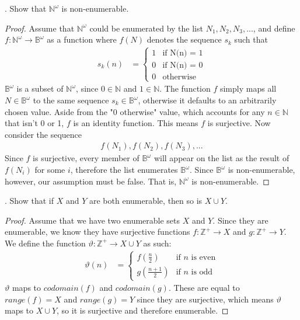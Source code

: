 \documentclass[11pt]{article}
\begin{document}
\newpage
{}. Show that $\mathbb{N}^\omega$ is non-enumerable.

\color{RoyalBlue}
\begin{proof}
Assume that $\mathbb{N}^\omega$ could be enumerated by the list $N_1, N_2, N_3, ...$, and define $f: \mathbb{N}^\omega \to \mathbb{B}^\omega$ as a function where $f(N)$ denotes the sequence $s_k$ such that
\begin{align}
    s_k(n) & = 
    \begin{cases} 
    1 & \text{if N(n) = 1} \\
    0 & \text{if N(n) = 0} \\
    0 & \text{otherwise}
    \end{cases}
\end{align}
$\mathbb{B}^\omega$ is a subset of $\mathbb{N}^\omega$, since $0 \in \mathbb{N}$ and $1 \in \mathbb{N}$. The function $f$ simply maps all $N \in \mathbb{B}^\omega$ to the same sequence $s_k \in \mathbb{B}^\omega$, otherwise it defaults to an arbitrarily chosen value. Aside from the "0 otherwise" value, which accounts for any $n \in \mathbb{N}$ that isn't 0 or 1, $f$ is an identity function. This means $f$ is surjective. Now consider the sequence
\begin{align}
    f(N_1), f(N_2), f(N_3), ...
\end{align}
Since $f$ is surjective, every member of $\mathbb{B}^\omega$ will appear on the list as the result of $f(N_i)$ for some $i$, therefore the list enumerates $\mathbb{B}^\omega$. Since $\mathbb{B}^\omega$ is non-enumerable, however, our assumption must be false. That is, $\mathbb{N}^\omega$ is non-enumerable.
\end{proof}
\color{black}


\newpage
{}. Show that if $X$ and $Y$ are both enumerable, then so is $X \cup Y$.

\color{RoyalBlue}
\begin{proof}
Assume that we have two enumerable sets $X$ and $Y$. Since they are enumerable, we know they have surjective functions $f: \mathbb{Z}^+ \to X$ and $g: \mathbb{Z}^+ \to Y$. We define the function $\vartheta: \mathbb{Z}^+ \to X \cup Y$ as such:
\begin{align}
    \vartheta(n) & = 
    \begin{cases} 
    f(\frac{n}{2}) & \text{if $n$ is even} \\
    g(\frac{n+1}{2}) & \text{if $n$ is odd}
    \end{cases}
\end{align}
$\vartheta$ maps to $codomain(f)$ and $codomain(g)$. These are equal to $range(f) = X$ and $range(g) = Y$ since they are surjective, which means $\vartheta$ maps to $X \cup Y$, so it is surjective and therefore enumerable.
\end{proof}
\color{black}
\end{document}

